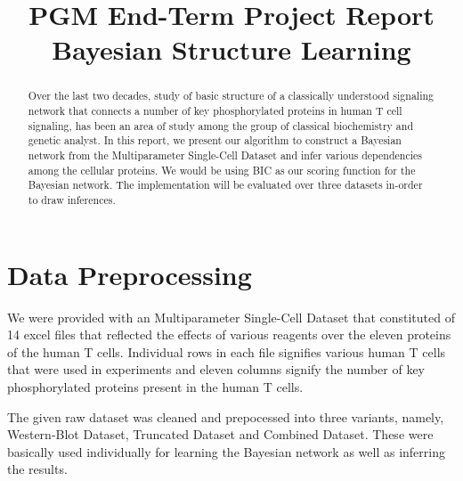 \documentclass[conference]{IEEEtran}
\begin{document}
\title{PGM End-Term Project Report\\Bayesian Structure Learning}

\author{
\and
{}
}

\maketitle

\begin{abstract}
Over the last two decades, study of basic structure of a classically understood signaling network that connects a number of key phosphorylated proteins in human T cell signaling, has been an area of study among the group of classical biochemistry and genetic analyst. In this report, we present our algorithm to construct a Bayesian network from the Multiparameter Single-Cell Dataset and infer various dependencies among the cellular proteins. We would be using BIC as our scoring function for the Bayesian network. The implementation will be evaluated over three datasets in-order to draw inferences.
\end{abstract}

\IEEEpeerreviewmaketitle

\section{Data Preprocessing}
We were provided with an Multiparameter Single-Cell Dataset that constituted of 14 excel files that reflected the effects of various reagents over the eleven proteins of the human T cells. Individual rows in each file signifies various human T cells that were used in experiments and eleven columns signify the number of key phosphorylated proteins present in the human T cells.
\par
The given raw dataset was cleaned and prepocessed into three variants, namely, Western-Blot Dataset, Truncated Dataset and Combined Dataset. These were basically used individually for learning the Bayesian network as well as inferring the results.
\end{document}
